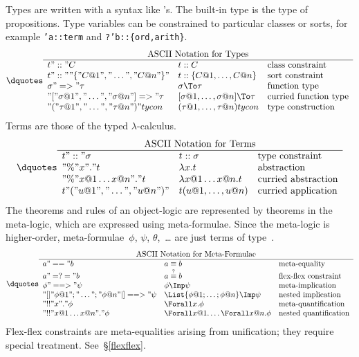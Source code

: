 Types are written with a syntax like \ML's.  The built-in type 
is the type of propositions.  Type variables can be constrained to particular
classes or sorts, for example {\tt 'a::term} and {\tt ?'b::\{ord,arith\}}.
\[\dquotes
\begin{array}{lll}
    \multicolumn{3}{c}{\hbox{ASCII Notation for Types}} \\ \hline
  t "::" C              & t :: C        & \hbox{class constraint} \\
  t "::" "\{"   C@1 "," \ldots "," C@n "\}" &
     t :: \{C@1,\dots,C@n\}             & \hbox{sort constraint} \\
  \sigma"=>"\tau        & \sigma\To\tau & \hbox{function type} \\
  "[" \sigma@1 "," \ldots "," \sigma@n "] => " \tau &
     [\sigma@1,\ldots,\sigma@n] \To\tau & \hbox{curried function type} \\
  "(" \tau@1"," \ldots "," \tau@n ")" tycon & 
     (\tau@1, \ldots, \tau@n)tycon      & \hbox{type construction}
\end{array} 
\]
Terms are those of the typed $\lambda$-calculus.
\[\dquotes
\begin{array}{lll}
    \multicolumn{3}{c}{\hbox{ASCII Notation for Terms}} \\ \hline
  t "::" \sigma         & t :: \sigma   & \hbox{type constraint} \\
  "\%" x "." t          & \lambda x.t   & \hbox{abstraction} \\
  "\%" x@1\ldots x@n "." t  & \lambda x@1\ldots x@n.t & 
     \hbox{curried abstraction} \\
  t "(" u@1"," \ldots "," u@n ")" & 
  t (u@1, \ldots, u@n) & \hbox{curried application}
\end{array}  
\]
The theorems and rules of an object-logic are represented by theorems in
the meta-logic, which are expressed using meta-formulae.  Since the
meta-logic is higher-order, meta-formulae~$\phi$, $\psi$, $\theta$,~\ldots{}
are just terms of type~.  
\[\dquotes
  \begin{array}{l@{\quad}l@{\quad}l}
    \multicolumn{3}{c}{\hbox{ASCII Notation for Meta-Formulae}} \\ \hline
  a " == " b    & a\equiv b &   \hbox{meta-equality} \\
  a " =?= " b   & a\qeq b &     \hbox{flex-flex constraint} \\
  \phi " ==> " \psi & \phi\Imp \psi & \hbox{meta-implication} \\
  "[|" \phi@1 ";" \ldots ";" \phi@n "|] ==> " \psi & 
  \List{\phi@1;\ldots;\phi@n} \Imp \psi & \hbox{nested implication} \\
  "!!" x "." \phi & \Forall x.\phi & \hbox{meta-quantification} \\
  "!!" x@1\ldots x@n "." \phi & 
  \Forall x@1. \ldots \Forall x@n.\phi & \hbox{nested quantification}
  \end{array}
\]
Flex-flex constraints are meta-equalities arising from unification; they
require special treatment.  See~\S\ref{flexflex}.

